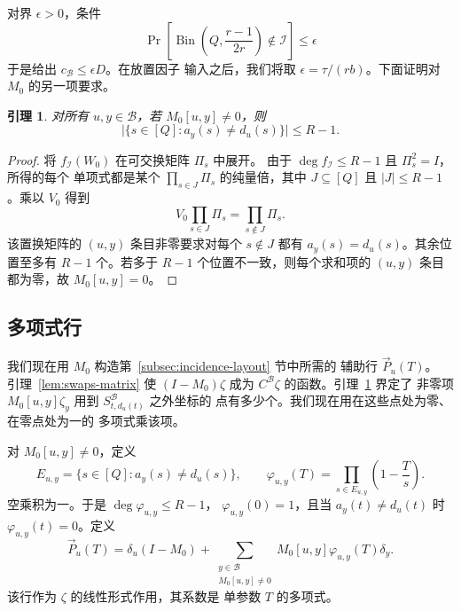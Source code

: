 \documentclass[11pt,reqno]{amsart}
\numberwithin{equation}{section}
\newtheorem{lemma}[theorem]{引理}
\theoremstyle{definition}\newtheorem{definition}[theorem]{定义}
\theoremstyle{remark}\newtheorem{remark}[theorem]{注}
\renewcommand{\le}{\leqslant}
\begin{document}
对界 $\epsilon>0$，条件
\begin{equation}\label{eq:incidence-tail}
 \Pr\!\left[\operatorname{Bin}\!\left(Q,\frac{r-1}{2r}\right)
                         \notin\mathcal I\right]\le\epsilon
\end{equation}
于是给出 $c_{\mathcal B}\le\epsilon D$。在放置因子
输入之后，我们将取 $\epsilon=\tau/(rb)$。下面证明对 $M_0$ 的另一项要求。

\begin{lemma}\label{lem:swaps-support}
对所有 $u,y\in\mathcal B$，若 $M_0[u,y]\ne0$，则
\[
 \bigl|\{s\in[Q]:a_y(s)\ne d_u(s)\}\bigr|\le R-1.
\]
\end{lemma}
\begin{proof}
将 $f_{\mathcal I}(W_0)$ 在可交换矩阵 $\Pi_s$ 中展开。
由于 $\deg f_{\mathcal I}\le R-1$ 且 $\Pi_s^2=I$，所得的每个
单项式都是某个 $\prod_{s\in J}\Pi_s$ 的纯量倍，其中
$J\subseteq[Q]$ 且 $|J|\le R-1$。乘以 $V_0$ 得到
\[
 V_0\prod_{s\in J}\Pi_s=\prod_{s\notin J}\Pi_s.
\]
该置换矩阵的 $(u,y)$ 条目非零要求对每个 $s\notin J$ 都有
$a_y(s)=d_u(s)$。其余位置至多有 $R-1$ 个。若多于 $R-1$
个位置不一致，则每个求和项的 $(u,y)$ 条目都为零，故
$M_0[u,y]=0$。
\end{proof}

\subsection{多项式行}
我们现在用 $M_0$ 构造第~\ref{subsec:incidence-layout} 节中所需的
辅助行 $\vec{P}_u(T)$。
引理~\ref{lem:swaps-matrix} 使 $(I-M_0)\zeta$ 成为
$C^{\mathcal B}\zeta$ 的函数。引理~\ref{lem:swaps-support} 界定了
非零项 $M_0[u,y]\zeta_y$ 用到 $S^{\mathcal B}_{t,d_u(t)}$ 之外坐标的
点有多少个。我们现在用在这些点处为零、在零点处为一的
多项式乘该项。

对 $M_0[u,y]\ne0$，定义
\begin{equation}\label{eq:coefficient-correction}
 E_{u,y}=\{s\in[Q]:a_y(s)\ne d_u(s)\},\qquad
 \varphi_{u,y}(T)=\prod_{s\in E_{u,y}}\left(1-\frac Ts\right).
\end{equation}
空乘积为一。于是 $\deg\varphi_{u,y}\le R-1$，
$\varphi_{u,y}(0)=1$，且当
$a_y(t)\ne d_u(t)$ 时 $\varphi_{u,y}(t)=0$。定义
\begin{equation}\label{eq:swaps-row}
 \vec{P}_u(T)=\delta_u(I-M_0)+
 \sum_{\substack{y\in\mathcal B\\M_0[u,y]\ne0}}
 M_0[u,y]\varphi_{u,y}(T)\delta_y.
\end{equation}
该行作为 $\zeta$ 的线性形式作用，其系数是
单参数 $T$ 的多项式。
\end{document}
